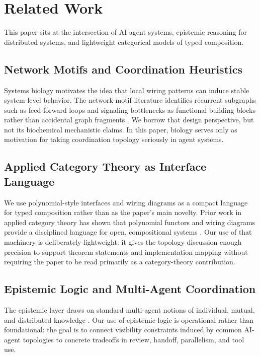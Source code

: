 \section{Related Work}

This paper sits at the intersection of AI agent systems, epistemic reasoning for distributed systems,
and lightweight categorical models of typed composition.

\subsection{Network Motifs and Coordination Heuristics}

Systems biology motivates the idea that local wiring patterns can induce stable system-level behavior.
The network-motif literature identifies recurrent subgraphs such as feed-forward loops and signaling
bottlenecks as functional building blocks rather than accidental graph fragments
\cite{milo2002network,alon2007network}. We borrow that design perspective, but not its biochemical
mechanistic claims. In this paper, biology serves only as motivation for taking coordination topology
seriously in agent systems.

\subsection{Applied Category Theory as Interface Language}

We use polynomial-style interfaces and wiring diagrams as a compact language for typed composition rather
than as the paper's main novelty. Prior work in applied category theory has shown that polynomial
functors and wiring diagrams provide a disciplined language for open, compositional systems
\cite{fong2019seven,spivak2021learners}. Our use of that machinery is deliberately lightweight: it gives
the topology discussion enough precision to support theorem statements and implementation mapping without
requiring the paper to be read primarily as a category-theory contribution.

\subsection{Epistemic Logic and Multi-Agent Coordination}

The epistemic layer draws on standard multi-agent notions of individual, mutual, and distributed
knowledge \cite{fagin1995reasoning,halpern1990knowledge}. Our use of epistemic logic is operational
rather than foundational: the goal is to connect visibility constraints induced by common AI-agent
topologies to concrete tradeoffs in review, handoff, parallelism, and tool use.

